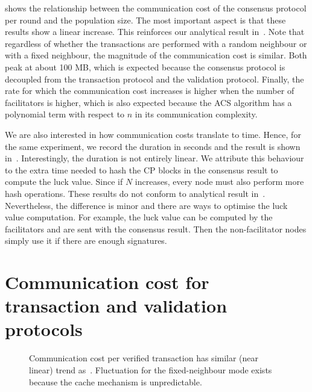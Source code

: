  shows the relationship between the communication cost of the consensus protocol per round and the population size.
The most important aspect is that these results show a linear increase.
This reinforces our analytical result in~.
Note that regardless of whether the transactions are performed with a random neighbour or with a fixed neighbour,
the magnitude of the communication cost is similar.
Both peak at about 100 MB,
which is expected because the consensus protocol is decoupled from the transaction protocol and the validation protocol.
Finally, the rate for which the communication cost increases is higher when the number of facilitators is higher,
which is also expected because the ACS algorithm has a polynomial term with respect to $n$ in its communication complexity.

We are also interested in how communication costs translate to time.
Hence, for the same experiment, we record the duration in seconds and the result is shown in~.
Interestingly, the duration is not entirely linear.
We attribute this behaviour to the extra time needed to hash the CP blocks in the consensus result to compute the luck value.
Since if $N$ increases, every node must also perform more hash operations.
These results do not conform to analytical result in~.
Nevertheless, the difference is minor and there are ways to optimise the luck value computation.
For example, the luck value can be computed by the facilitators and are sent with the consensus result.
Then the non-facilitator nodes simply use it if there are enough signatures.

\section{Communication cost for transaction and validation protocols}

\begin{figure}[h]
  \centering
  \caption{Communication cost per verified transaction has similar (near linear) trend as~.
  Fluctuation for the fixed-neighbour mode exists because the cache mechanism is unpredictable.}
  \label{fig:tx-comms}
\end{figure}

